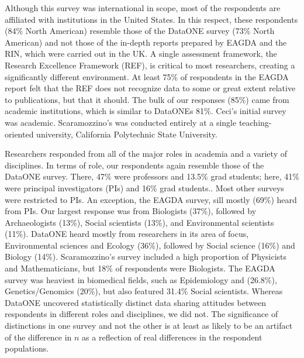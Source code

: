 \documentclass[10pt]{article}
\begin{document}
Although this survey was international in scope, most of the respondents are affiliated with institutions in the United States.
In this respect, these respondents (84\% North American) resemble those of the DataONE survey\cite{tenopir_data_2011} (73\% North American) and not those of the in-depth reports prepared by EAGDA\cite{bobrow_establishing_2014} and the RIN\cite{swan_share_2008}, which were carried out in the UK.
A single assessment framework, the Research Excellence Framework (REF), is critical to most researchers, creating a significantly different environment.
At least 75\% of respondents in the EAGDA report felt that the REF does not recognize data to some or great extent relative to publications, but that it should\cite{bobrow_establishing_2014}.
The bulk of our responses (85\%) came from academic institutions, which is similar to DataONEs 81\%\cite{tenopir_data_2011}.  
Ceci's initial survey was academic\cite{ceci_scientists_1988}.
Scaramozzino's was conducted entirely at a single teaching-oriented university, California Polytechnic State University\cite{scaramozzino_study_2012}. 

Researchers responded from all of the major roles in academia and a variety of disciplines.
In terms of role, our respondents again resemble those of the DataONE survey.
There, 47\% were professors and 13.5\% grad students; here, 41\% were principal investigators (PIs) and 16\% grad students\cite{tenopir_data_2011}..
Most other surveys were restricted to PIs.
An exception, the EAGDA survey, sill mostly (69\%) heard from PIs\cite{bobrow_establishing_2014}.
Our largest response was from Biologists (37\%), followed by Archaeologists (13\%), Social scientists (13\%), and Environmental scientists (11\%). 
DataONE heard mostly from researchers in its area of focus, Environmental sciences and Ecology (36\%), followed by Social science (16\%) and Biology (14\%)\cite{tenopir_data_2011}. 
Scaramozzino's survey included a high proportion of Physicists and Mathematicians, but 18\% of respondents were Biologists\cite{scaramozzino_study_2012}.
The EAGDA survey was heaviest in biomedical fields, such as Epidemiology and (26.8\%), Genetics/Genomics (20\%), but also featured 31.4\% Social scientists\cite{bobrow_establishing_2014}. 
Whereas DataONE uncovered statistically distinct data sharing attitudes between respondents in different roles and disciplines, we did not.
The significance of distinctions in one survey and not the other is at least as likely to be an artifact of the difference in $n$ as a reflection of real differences in the respondent populations.
\end{document}
